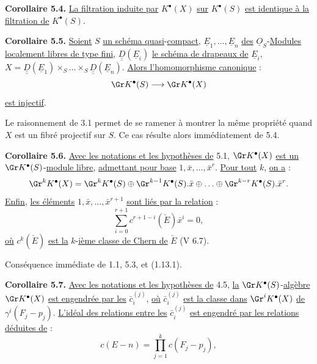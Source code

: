 
\textbf{Corollaire 5.4.} \uline{La filtration induite par} $K^{\bullet}(X)$ \uline{sur} $K^{\bullet}(S)$ \uline{est identique à la filtration de} $K^{\bullet}(S)$.

\textbf{Corollaire 5.5.} \uline{Soient} $S$ \uline{un schéma quasi}-\uline{compact}, $\underline{E}_1,\ldots,\underline{E}_n$ \uline{des} $\underline{O}_S$-\uline{Modules} \uline{localement libres de type fini}, $\underline{\underline{D}}(\underline{E}_i)$ \uline{le schéma de drapeaux de} $\underline{E}_i$, $X=\underline{\underline{D}}(\underline{E}_1)\times_S\ldots\times_S \underline{\underline{D}}(\underline{E}_n)$. \uline{Alors l'homomorphisme canonique} :
\[
  \Gr K^{\bullet}(S)\longrightarrow \Gr K^{\bullet}(X)
\]
\uline{est injectif}.

Le raisonnement de 3.1 permet de se ramener à montrer la même propriété quand $X$ est un fibré projectif sur $S$. Ce cas résulte alors immédiatement de 5.4.

\textbf{Corollaire 5.6.} \uline{Avec les notations et les hypothèses de} 5.1, $\Gr K^{\bullet}(X)$ \uline{est un} $\Gr K^{\bullet}(S)$-\uline{module libre}, \uline{admettant pour base} $1,\bar x,\ldots,\bar x^r$. \uline{Pour tout} $k$, \uline{on a} :
\[
  \Gr^kK^{\bullet}(X)=\Gr^kK^{\bullet}(S)\oplus \Gr^{k-1}K^{\bullet}(S).\bar x\oplus\ldots\oplus \Gr^{k-r}K^{\bullet}(S).\bar x^r .
\]
\uline{Enfin}, \uline{les éléments} $1,\bar x,\ldots,\bar x^{r+1}$ \uline{sont liés par la relation} :
\[
  \sum_{i=0}^{r+1}c^{r+1-i}(\check E)\bar x^i=0,
\]
\uline{où} $c^k(\check E)$ \uline{est la} $k$-\uline{ième classe de Chern de} $\check E$ (V 6.7).

Conséquence immédiate de 1.1, 5.3, et (1.13.1).

\textbf{Corollaire 5.7.} \uline{Avec les notations et les hypothèses de} 4.5, \uline{la} $\Gr K^{\bullet}(S)$-\uline{algèbre} $\Gr K^{\bullet}(X)$ \uline{est engendrée par les} $\bar c_i^{(j)}$, \uline{où} $\bar c_i^{(j)}$ \uline{est la classe dans} $\Gr^iK^{\bullet}(X)$ \uline{de} $\gamma^i(F_j-p_j)$. \uline{L'idéal des relations entre les} $\bar c_i^{(j)}$ \uline{est engendré par les relations déduites de} :
\[
  c(E-n)=\prod_{j=1}^{k}c(F_j-p_j),
\]
